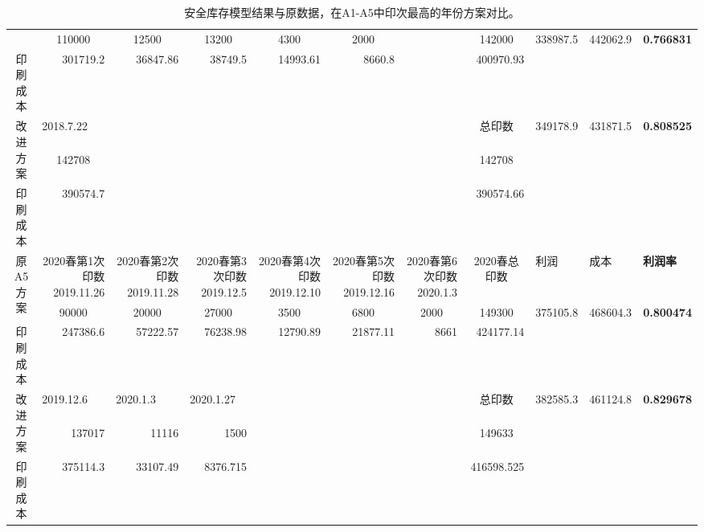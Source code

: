 \documentclass[bwprint]{gmcmthesis}
\begin{document}
\begin{table}[htbp]
{\begin{tabular}{crrrrrrrccc}
          & \multicolumn{1}{c}{110000} & \multicolumn{1}{c}{12500} & \multicolumn{1}{c}{13200} & \multicolumn{1}{c}{4300} & \multicolumn{1}{c}{2000} &       & \multicolumn{1}{c}{142000} & \multirow{2}[0]{*}{338987.5} & \multirow{2}[0]{*}{442062.9} & \multirow{2}[0]{*}{\textbf{0.766831}} \\
    印刷成本  & 301719.2 & 36847.86 & 38749.5 & 14993.61 & 8660.8 &       & 400970.93 &       &       &  \\
    \multirow{2}[0]{*}{改进方案} & \multicolumn{1}{l}{2018.7.22} &       &       &       &       &       & \multicolumn{1}{c}{总印数} & \multirow{3}[0]{*}{349178.9} & \multirow{3}[0]{*}{431871.5} & \multirow{2}[0]{*}{\textbf{0.808525}} \\
          & \multicolumn{1}{c}{142708} &       &       &       &       &       & \multicolumn{1}{c}{142708} &       &       &  \\
    印刷成本  & 390574.7 &       &       &       &       &       & 390574.66 &       &       &  \\
     \midrule
    \multirow{2}[0]{*}{原A5方案} & \multicolumn{1}{p{4.04em}}{2020春第1次印数2019.11.26} & \multicolumn{1}{p{4.04em}}{2020春第2次印数2019.11.28} & \multicolumn{1}{p{4.04em}}{2020春第3次印数2019.12.5} & \multicolumn{1}{p{4.04em}}{2020春第4次印数2019.12.10} & \multicolumn{1}{p{4.04em}}{2020春第5次印数2019.12.16} & \multicolumn{1}{p{4.04em}}{2020春第6次印数2020.1.3} & \multicolumn{1}{c}{2020春总印数} & \multicolumn{1}{l}{利润} & \multicolumn{1}{l}{成本} & \multicolumn{1}{l}{\textbf{利润率}} \\
          & \multicolumn{1}{c}{90000} & \multicolumn{1}{c}{20000} & \multicolumn{1}{c}{27000} & \multicolumn{1}{c}{3500} & \multicolumn{1}{c}{6800} & \multicolumn{1}{c}{2000} & \multicolumn{1}{c}{149300} & \multirow{2}[0]{*}{375105.8} & \multirow{2}[0]{*}{468604.3} & \multirow{2}[0]{*}{\textbf{0.800474}} \\
    印刷成本  & 247386.6 & 57222.57 & 76238.98 & 12790.89 & 21877.11 & 8661  & 424177.14 &       &       &  \\
    \multirow{2}[0]{*}{改进方案} & \multicolumn{1}{l}{2019.12.6} & \multicolumn{1}{l}{2020.1.3} & \multicolumn{1}{l}{2020.1.27} &       &       &       & \multicolumn{1}{c}{总印数} & \multirow{3}[0]{*}{382585.3} & \multirow{3}[0]{*}{461124.8} & \multirow{2}[0]{*}{\textbf{0.829678}} \\
          & 137017 & 11116 & 1500  &       &       &       & \multicolumn{1}{c}{149633} &       &       &  \\
    印刷成本  & 375114.3 & 33107.49 & 8376.715 &       &       &       & 416598.525 &       &       &  \\
    \bottomrule
    \end{tabular}%
    }
  \label{tab:verify}
  \caption{安全库存模型结果与原数据，在A1-A5中印次最高的年份方案对比。}
\end{table}
\end{document}
